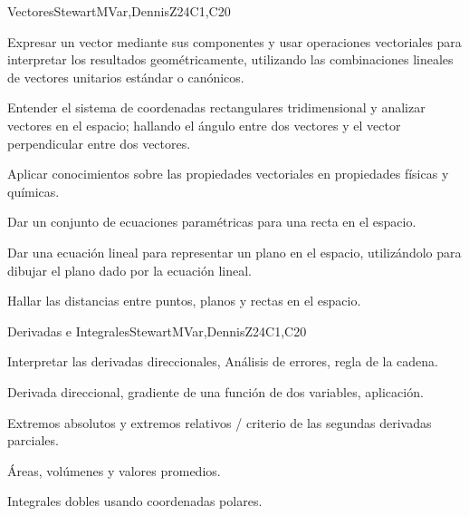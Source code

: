 \begin{syllabus}
\begin{unit}{Vectores}{}{StewartMVar,DennisZ}{24}{C1,C20}
  \begin{learningoutcomes}
  \item Expresar un vector mediante sus componentes y usar operaciones vectoriales para interpretar los resultados geométricamente, utilizando las combinaciones lineales de vectores unitarios estándar o canónicos.
  \item Entender el sistema de coordenadas rectangulares tridimensional y analizar vectores en el espacio; hallando el ángulo entre dos vectores y el vector perpendicular entre dos vectores.
  \item Aplicar conocimientos sobre las propiedades vectoriales en propiedades físicas y químicas.
  \item Dar un conjunto de ecuaciones paramétricas para una recta en el espacio.
  \item Dar una ecuación lineal para representar un plano en el espacio, utilizándolo para dibujar el plano dado por la ecuación lineal.
  \item Hallar las distancias entre puntos, planos y rectas en el espacio.
  \end{learningoutcomes}
\end{unit}

\begin{unit}{Derivadas e Integrales}{}{StewartMVar,DennisZ}{24}{C1,C20}
  \begin{topics}
    \item Interpretar las derivadas direccionales, Análisis de errores, regla de la cadena.
    \item Derivada direccional, gradiente de una función de dos variables, aplicación.
    \item Extremos absolutos y extremos relativos / criterio de las segundas derivadas parciales.
    \item Áreas, volúmenes y valores promedios.
    \item Integrales dobles usando coordenadas polares.
\end{topics}  


\end{unit}
\end{syllabus}

